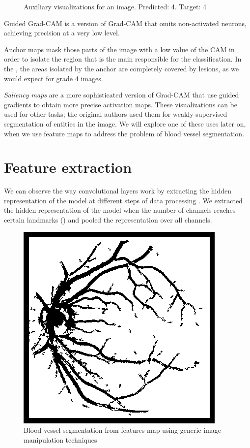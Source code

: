 \begin{figure}[htb]
     \centering
     \caption{Auxiliary visualizations for an image. Predicted: 4. Target: 4}
     \label{fig:visualizations}
\end{figure}

Guided Grad-CAM is a version of Grad-CAM that omits non-activated neurons, achieving precision at a very low level. 

Anchor maps mask those parts of the image with a low value of the CAM in order to isolate the region that is the main responsible for the classification. In the , the areas isolated by the anchor are completely covered by lesions, as we would expect for grade 4 images. 

 \textit{Saliency maps} are a more sophisticated version of Grad-CAM \cite{simonyan2013deep} that use guided gradients to obtain more precise activation maps. These visualizations can be used for other tasks; the original authors used them for weakly supervised segmentation of entities in the image. We will explore one of these uses later on, when we use feature maps to address the problem of blood vessel segmentation.

\section{Feature extraction}
We can observe the way convolutional layers work by extracting the hidden representation of the model at different steps of data processing \cite{zeiler2014visualizing}. We extracted the hidden representation of the model when the number of channels reaches certain landmarks () and pooled the representation over all channels. 

\begin{figure}[tb]
    \centering
    \includegraphics[scale = 0.35]{figures/chapter6/features/segmentation.png}
    \caption{Blood-vessel segmentation from features map using generic image manipulation techniques}
    \label{fig:segmentation}
\end{figure}

